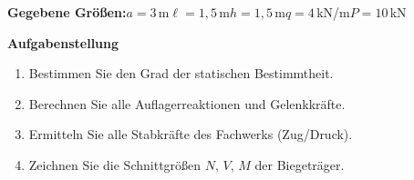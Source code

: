 \documentclass[a4paper,11pt]{article}
\begin{document}
\textbf{Gegebene Größen:}\quad $a=3$\,m\quad $\ell=1,5$\,m\quad $h=1,5$\,m\quad $q=4$\,kN/m\quad $P=10$\,kN
\par\medskip
\textbf{Aufgabenstellung}\par
\begin{enumerate}[label=\textbf{\arabic*.}]
  \item Bestimmen Sie den Grad der statischen Bestimmtheit.
  \item Berechnen Sie alle Auflagerreaktionen und Gelenkkräfte.
  \item Ermitteln Sie alle Stabkräfte des Fachwerks (Zug/Druck).
  \item Zeichnen Sie die Schnittgrößen $N$, $V$, $M$ der Biegeträger.
\end{enumerate}
\end{document}
